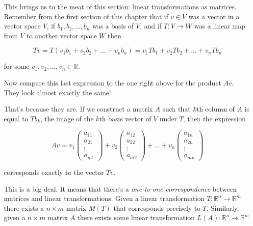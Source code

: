 \documentclass[12pt]{article}
\begin{document}
\vskip 3mm
This brings us to the meat of this section: linear transformations as matrices. Remember from the first section of this chapter that if $v \in V$ was a vector in a vector space $V$, if $b_1, b_2, \ldots, b_n$ was a basis of $V$, and if $T : V \rightarrow W$ was a linear map from $V$ to another vector space $W$ then

$$Tv = T(v_1 b_1 + v_2 b_2 + \ldots + v_n b_n) = v_1 Tb_1 + v_2 Tb_2 + \ldots + v_n Tb_n$$

for some $v_1, v_2, \ldots, v_n \in \mathbb{R}$.

\vskip 3mm

Now compare this last expression to the one right above for the product $Av$. They look almost exactly the same!

\vskip 2mm
That's because they are. If we construct a matrix $A$ such that $k$th column of $A$ is equal to $Tb_k$, the image of the $k$th basis vector of $V$ under $T$, then the expression

\[ Av = 
%
v_1  \begin{pmatrix}
a_{11} \\
a_{21} \\
\vdots \\
a_{m1}
\end{pmatrix} +
%
v_2  \begin{pmatrix}
a_{12} \\
a_{22} \\
\vdots \\
a_{m2}
\end{pmatrix} +
\ldots +
%
v_n  \begin{pmatrix}
a_{1n} \\
a_{2n} \\
\vdots \\
a_{mn}
\end{pmatrix} \]

\vskip 1mm

corresponds exactly to the vector $Tv$.

\vskip 3mm
This is a big deal. It means that there's a \textit{one-to-one correspondence} between matrices and linear transformations. Given a linear transformation $T : \mathbb{R}^n \rightarrow \mathbb{R}^m$ there exists a $n \times m$ matrix $M(T)$ that corresponds precisely to $T$. Similarly, given a $n \times m$ matrix $A$ there exists some linear transformation $L(A) : \mathbb{R}^n \rightarrow \mathbb{R}^m$
\end{document}
